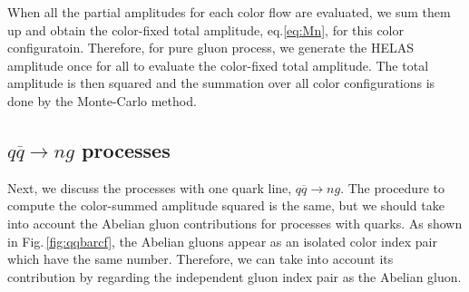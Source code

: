 \documentclass[a4paper,11pt]{article}
\begin{document}
 When all the partial amplitudes for each color flow are
 evaluated, we sum them up and obtain the color-fixed total
amplitude, eq.\eqref{eq:Mn}, for this color configuratoin. Therefore,
for pure gluon process, we generate the HELAS amplitude once for all to evaluate
the color-fixed total amplitude. The total amplitude is then squared and
 the summation over all color
configurations is done by the
Monte-Carlo method.

\subsection{$q\overline{q}\rightarrow ng$ processes}
Next, we discuss the processes with one quark line,
$q\overline{q}\rightarrow ng$. The procedure to compute the color-summed amplitude squared is the same, but we should take into account
the Abelian gluon contributions for processes with quarks. As shown in Fig.\,\ref{fig:qqbarcf}, the Abelian gluons appear
as an isolated color index pair which have the same number. Therefore, we can take into account its contribution by regarding the independent gluon index pair as the
Abelian gluon.
\end{document}
